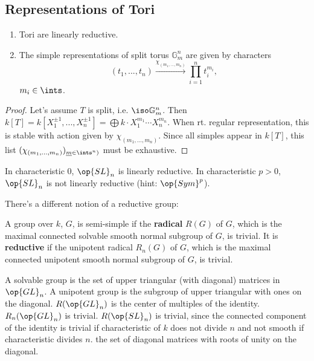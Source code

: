 \subsection{Representations of Tori}
\begin{lem}
\begin{enumerate}[(1)]
\item Tori are linearly reductive.
\item The simple representations of split torus $\mathbb{G}_m^n$ are given by
characters
\[(t_1, ..., t_n) \xrightarrow{\chi_(m_1, ..., m_n)} \prod_{i = 1}^n t_i ^ {m_i}, \]
$m_i \in \ints$.
\end{enumerate}
\end{lem}

\begin{proof}
Let's assume $T$ is split, i.e. $\iso \mathbb{G}_m^n$. Then
$k[T] = k[X_1^{\pm 1}, ..., X_n^{\pm 1}]
    = \bigoplus k \cdot X_1^{m_1} \cdots X_n^{m_n}.$
When rt. regular representation, this is stable with action given by
$\chi_{(m_1, ..., m_n)}$. Since all simples appear in $k[T]$, this list
$(\chi_{(m_1, ..., m_n)})_{\underline{m} \in \ints^n)}$ must be exhaustive.
\end{proof}

\begin{ex}
In characteristic 0, $\op{SL}_n$ is linearly reductive. In characteristic
$p > 0$, $\op{SL}_n$ is not linearly reductive (hint: $\op{Sym}^p$).
\end{ex}

There's a different notion of a reductive group:

\begin{defn}
A group over $k$, $G$, is semi-simple if the \textbf{radical} $R(G)$ of $G$, 
which is the maximal connected solvable smooth normal subgroup of $G$, is 
trivial. It is \textbf{reductive} if the unipotent radical $R_n(G)$ of $G$, 
which is the  maximal connected unipotent smooth normal subgroup of $G$, is 
trivial.

\end{defn}

\begin{exmpl}
A solvable group is the set of upper triangular (with diagonal) matrices in
$\op{GL}_n$. A unipotent group is the subgroup of upper triangular with ones on
the diagonal. $R(\op{GL}_n)$ is the center of multiples of the identity.
$R_n(\op{GL}_n)$ is trivial. $R(\op{SL}_n)$ is trivial, since 
the connected component of the identity is trivial if characteristic of $k$ does
not divide $n$ and not smooth if characteristic divides $n$.
the set of diagonal matrices with roots of unity on the diagonal.
\end{exmpl}

